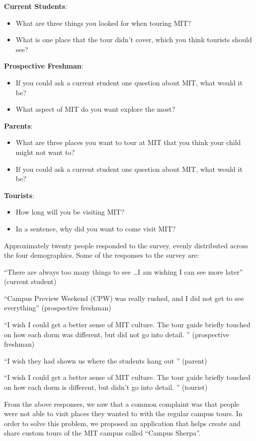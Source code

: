 \documentclass{sigchi}
\begin{document}
\textbf{Current Students}:
\begin{itemize}
	\item What are three things you looked for when touring MIT?
	\item What is one place that the tour didn’t cover, which you think tourists should see?
\end{itemize}

\textbf{Prospective Freshman}:
\begin{itemize}
	\item If you could ask a current student one question about MIT, what would it be?
	\item What aspect of MIT do you want explore the most?
\end{itemize}

\textbf{Parents}:
\begin{itemize}
	\item What are three places you want to tour at MIT that you think your child might not want to?
	\item If you could ask a current student one question about MIT, what would it be?
\end{itemize}

\textbf{Tourists}:
\begin{itemize}
	\item How long will you be visiting MIT?
	\item In a sentence, why did you want to come visit MIT?
\end{itemize}

Approximately twenty people responded to the survey, evenly distributed across the four demographics. Some of the responses to the survey are:

``There are always too many things to see \ldots I am wishing I can see more later'' (current student)

``Campus Preview Weekend (CPW) was really rushed, and I did not get to see everything'' (prospective freshman)

``I wish I could get a better sense of MIT culture. The tour guide briefly touched on how each dorm was different, but did not go into detail. '' (prospective freshman)

``I wish they had shown us where the students hang out '' (parent)

``I wish I could get a better sense of MIT culture. The tour guide briefly touched on how each dorm is different, but didn't go into detail. '' (tourist)

From the above responses, we saw that a common complaint was that people were not able to visit places they wanted to with the regular campus tours. In order to solve this problem, we proposed an application that helps create and share custom tours of the MIT campus called ``Campus Sherpa''.
\end{document}
